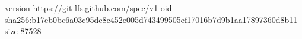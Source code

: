 version https://git-lfs.github.com/spec/v1
oid sha256:b17eb0bc6a03c95dc8c452e005d743499505ef17016b7d9b1aa17897360d8b11
size 87528
